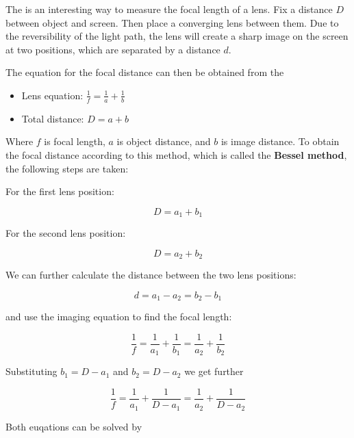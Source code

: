 \documentclass[
  a4paper,
]{book}
\providecommand{\tightlist}{%
  \setlength{\itemsep}{0pt}\setlength{\parskip}{0pt}}
\begin{document}
\begin{tcolorbox}[enhanced jigsaw, breakable, toptitle=1mm, bottomrule=.15mm, colbacktitle=quarto-callout-note-color!10!white, title=\textcolor{quarto-callout-note-color}{\faInfo}\hspace{0.5em}{Bessel's method to measure the focal length of a lens}, arc=.35mm, rightrule=.15mm, bottomtitle=1mm, opacityback=0, toprule=.15mm, coltitle=black, leftrule=.75mm, opacitybacktitle=0.6, colback=white, left=2mm, titlerule=0mm, colframe=quarto-callout-note-color-frame]

The is an interesting way to measure the focal length of a lens. Fix a
distance \(D\) between object and screen. Then place a converging lens
between them. Due to the reversibility of the light path, the lens will
create a sharp image on the screen at two positions, which are separated
by a distance \(d\).

The equation for the focal distance can then be obtained from the

\begin{itemize}
\tightlist
\item
  Lens equation: \(\frac{1}{f} = \frac{1}{a} + \frac{1}{b}\)
\item
  Total distance: \(D = a + b\)
\end{itemize}

Where \(f\) is focal length, \(a\) is object distance, and \(b\) is
image distance. To obtain the focal distance according to this method,
which is called the \textbf{Bessel method}, the following steps are
taken:

For the first lens position:

\[D = a_1 + b_1\]

For the second lens position:

\[D = a_2 + b_2\]

We can further calculate the distance between the two lens positions:

\[d = a_1 - a_2 = b_2 - b_1\]

and use the imaging equation to find the focal length:

\[\frac{1}{f} = \frac{1}{a_1} + \frac{1}{b_1} = \frac{1}{a_2} + \frac{1}{b_2}\]

Substituting \(b_1 = D - a_1\) and \(b_2 = D - a_2\) we get further

\[\frac{1}{f} = \frac{1}{a_1} + \frac{1}{D-a_1} = \frac{1}{a_2} + \frac{1}{D-a_2}\]

Both euqations can be solved by


\end{tcolorbox}
\end{document}
